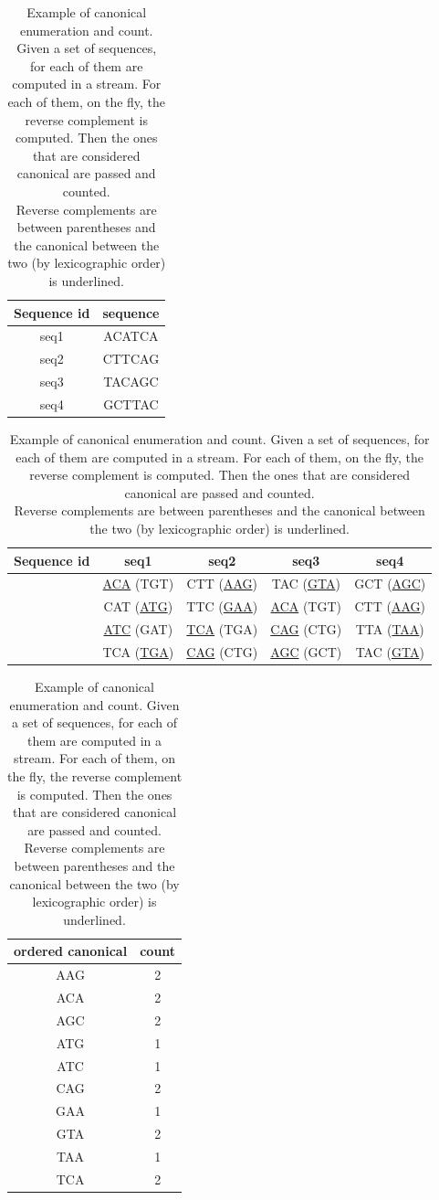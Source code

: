 \begin{table}
	\begin{center}
		\begin{tabular}{c | c}
			
			Sequence id & sequence \\
			\hline
			seq1 & ACATCA \\
			seq2 & CTTCAG \\
			seq3 & TACAGC \\
			seq4 & GCTTAC \\
			
		\end{tabular}
		\newline
		\vspace*{0.2 cm}
		\newline
		
		\begin{tabular}{c | c | c | c  | c}
			
			Sequence id & seq1 & seq2 & seq3 & seq4\\
			\hline
			\kmers  & \underline{ACA} (TGT) & CTT (\underline{AAG}) & TAC (\underline{GTA}) & GCT (\underline{AGC}) \\
			& CAT (\underline{ATG}) & TTC (\underline{GAA}) & \underline{ACA} (TGT) & CTT (\underline{AAG}) \\
			& \underline{ATC} (GAT) & \underline{TCA} (TGA) & \underline{CAG} (CTG) & TTA (\underline{TAA}) \\
			& TCA (\underline{TGA}) & \underline{CAG} (CTG) & \underline{AGC} (GCT) & TAC (\underline{GTA}) \\
		\end{tabular}
		\newline
		\vspace*{0.2 cm}
		\newline
		
		\begin{tabular}{c | c}
			
			ordered canonical \kmer & count\\
			\hline
			AAG & 2 \\
			ACA & 2 \\
			AGC & 2 \\
			ATG & 1 \\
			ATC & 1 \\
			CAG & 2 \\
			GAA & 1 \\
			GTA & 2 \\
			TAA & 1 \\
			TCA & 2 \\
		\end{tabular}
	\end{center}
	\caption[Example of canonical \kmer counting.]{Example of canonical \kmers enumeration and count. Given a set of sequences, for each of them \kmers are computed in a stream. For each of them, on the fly, the reverse complement is computed. Then the ones that are considered canonical are passed and counted.\\ Reverse complements are between parentheses and the canonical between the two (by lexicographic order) is underlined.}
	\label{tab-lista-kmer}
\end{table}

